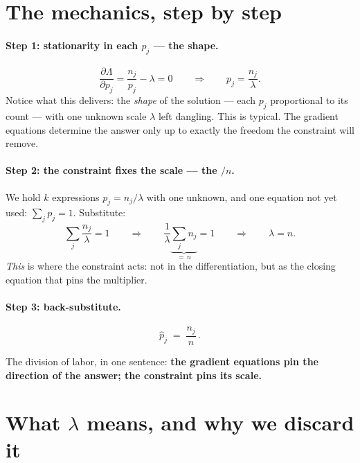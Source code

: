 \documentclass[11pt]{article}
\begin{document}
\section{The mechanics, step by step}

\paragraph{Step 1: stationarity in each $p_j$ --- the shape.}
\begin{equation*}
  \frac{\partial \Lambda}{\partial p_j}
  = \frac{n_j}{p_j} - \lambda = 0
  \qquad\Longrightarrow\qquad
  p_j = \frac{n_j}{\lambda}.
\end{equation*}
Notice what this delivers: the \emph{shape} of the solution --- each
$p_j$ proportional to its count --- with one unknown scale $\lambda$
left dangling. This is typical. The gradient equations determine the
answer only up to exactly the freedom the constraint will remove.

\paragraph{Step 2: the constraint fixes the scale --- the $/n$.}
We hold $k$ expressions $p_j = n_j/\lambda$ with one unknown, and one
equation not yet used: $\sum_j p_j = 1$. Substitute:
\begin{equation*}
  \sum_{j} \frac{n_j}{\lambda} = 1
  \qquad\Longrightarrow\qquad
  \frac{1}{\lambda}\underbrace{\sum_{j} n_j}_{=\,n} = 1
  \qquad\Longrightarrow\qquad
  \lambda = n .
\end{equation*}
\emph{This} is where the constraint acts: not in the differentiation,
but as the closing equation that pins the multiplier.

\paragraph{Step 3: back-substitute.}
\begin{equation}
  \hat p_j \;=\; \frac{n_j}{n}\,.
  \label{eq:answer}
\end{equation}

\medskip
\noindent
The division of labor, in one sentence: \textbf{the gradient equations
pin the direction of the answer; the constraint pins its scale.}

\section{What $\lambda$ means, and why we discard it}
\end{document}
